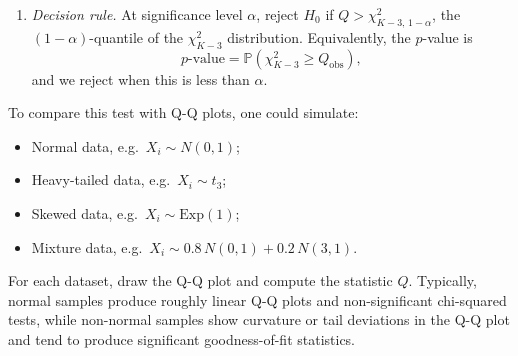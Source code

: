 \documentclass[letterpaper]{article}
\begin{document}
\begin{enumerate}
		\item \textit{Decision rule.}
		At significance level $\alpha$, reject $H_0$ if $Q>\chi^2_{K-3,\,1-\alpha}$, the $(1-\alpha)$-quantile of the $\chi^2_{K-3}$ distribution. Equivalently, the $p$-value is
		$$p\text{-value}=\mathbb{P}\!\left(\chi^2_{K-3}\ge Q_{\mathrm{obs}}\right),$$
		and we reject when this is less than $\alpha$.
	\end{enumerate}
	
	To compare this test with Q-Q plots, one could simulate:
	\begin{itemize}
		\item Normal data, e.g.\ $X_i\sim N(0,1)$;
		\item Heavy-tailed data, e.g.\ $X_i\sim t_3$;
		\item Skewed data, e.g.\ $X_i\sim \mathrm{Exp}(1)$;
		\item Mixture data, e.g.\ $X_i\sim 0.8\,N(0,1)+0.2\,N(3,1)$.
	\end{itemize}
	For each dataset, draw the Q-Q plot and compute the statistic $Q$. Typically, normal samples produce roughly linear Q-Q plots and non-significant chi-squared tests, while non-normal samples show curvature or tail deviations in the Q-Q plot and tend to produce significant goodness-of-fit statistics.
	
	
	\clearpage
	
\end{document}

